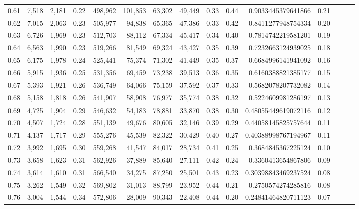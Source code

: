 \begin{tabular}{rrrrrrrrrrrrrrr}
0.61 &   7,518 &  2,181 &  0.22 &  498,962 &  101,853 &   63,302 &   49,449 &  0.33 &  0.44 &      0.9033445379641866 &      0.21 \\
0.62 &   7,015 &  2,063 &  0.23 &  505,977 &   94,838 &   65,365 &   47,386 &  0.33 &  0.42 &      0.8411277948754334 &      0.20 \\
0.63 &   6,726 &  1,969 &  0.23 &  512,703 &   88,112 &   67,334 &   45,417 &  0.34 &  0.40 &      0.7814742219581201 &      0.19 \\
0.64 &   6,563 &  1,990 &  0.23 &  519,266 &   81,549 &   69,324 &   43,427 &  0.35 &  0.39 &      0.7232663124939025 &      0.18 \\
0.65 &   6,175 &  1,978 &  0.24 &  525,441 &   75,374 &   71,302 &   41,449 &  0.35 &  0.37 &      0.6684996141941092 &      0.16 \\
0.66 &   5,915 &  1,936 &  0.25 &  531,356 &   69,459 &   73,238 &   39,513 &  0.36 &  0.35 &      0.6160388821385177 &      0.15 \\
0.67 &   5,393 &  1,921 &  0.26 &  536,749 &   64,066 &   75,159 &   37,592 &  0.37 &  0.33 &      0.5682078207732082 &      0.14 \\
0.68 &   5,158 &  1,818 &  0.26 &  541,907 &   58,908 &   76,977 &   35,774 &  0.38 &  0.32 &      0.5224609981286197 &      0.13 \\
0.69 &   4,725 &  1,904 &  0.29 &  546,632 &   54,183 &   78,881 &   33,870 &  0.38 &  0.30 &     0.48055449619072116 &      0.12 \\
0.70 &   4,507 &  1,724 &  0.28 &  551,139 &   49,676 &   80,605 &   32,146 &  0.39 &  0.29 &     0.44058145825757644 &      0.11 \\
0.71 &   4,137 &  1,717 &  0.29 &  555,276 &   45,539 &   82,322 &   30,429 &  0.40 &  0.27 &     0.40388998767194967 &      0.11 \\
0.72 &   3,992 &  1,695 &  0.30 &  559,268 &   41,547 &   84,017 &   28,734 &  0.41 &  0.25 &      0.3684845367225124 &      0.10 \\
0.73 &   3,658 &  1,623 &  0.31 &  562,926 &   37,889 &   85,640 &   27,111 &  0.42 &  0.24 &      0.3360413654867806 &      0.09 \\
0.74 &   3,614 &  1,610 &  0.31 &  566,540 &   34,275 &   87,250 &   25,501 &  0.43 &  0.23 &     0.30398843469237524 &      0.08 \\
0.75 &   3,262 &  1,549 &  0.32 &  569,802 &   31,013 &   88,799 &   23,952 &  0.44 &  0.21 &      0.2750574274285816 &      0.08 \\
0.76 &   3,004 &  1,544 &  0.34 &  572,806 &   28,009 &   90,343 &   22,408 &  0.44 &  0.20 &     0.24841464820711123 &      0.07 \\

\end{tabular}
